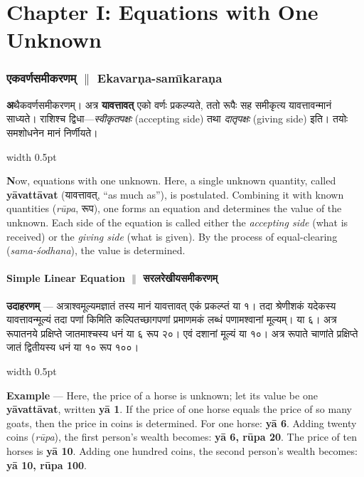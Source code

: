 \documentclass[11pt,a4paper]{article}
\newcommand{\dev}[1]{{\devanagarifont #1}}
\newcommand{\vs}{\vspace{0.5em}}
\newcommand{\bilingual}[2]{%
  \par\vspace{0.5em}%
  \noindent\begin{minipage}[t]{0.47\textwidth}%
  \setlength{\parindent}{0pt}%
  \small #1%
  \end{minipage}%
  \hfill\textcolor{columnrule}{\vrule width 0.5pt}\hfill%
  \begin{minipage}[t]{0.47\textwidth}%
  \setlength{\parindent}{0pt}%
  \small\raggedright #2%
  \end{minipage}%
  \par\vspace{0.5em}%
}
\begin{document}
\newpage

\part*{Chapter I: Equations with One Unknown}

\section*{\dev{एकवर्णसमीकरणम्} $\parallel$ Ekavar\d{n}a-sam\={\i}kara\d{n}a}

\bilingual{\textbf{\dev{अ}}थैकवर्णसमीकरणम्। अत्र \textbf{यावत्तावत्} एको वर्णः प्रकल्प्यते, ततो रूपैः सह समीकृत्य यावत्तावन्मानं साध्यते। राशिश्च द्विधा—\textit{स्वीकृतपक्षः} (accepting side) तथा \textit{दातृपक्षः} (giving side) इति। तयोः समशोधनेन मानं निर्णीयते।
}{%
\textbf{N}ow, equations with one unknown. Here, a single unknown quantity, called \textbf{y\={a}vatt\={a}vat} (\dev{यावत्तावत्}, ``as much as''), is postulated. Combining it with known quantities (\textit{r\={u}pa}, \dev{रूप}), one forms an equation and determines the value of the unknown. Each side of the equation is called either the \textit{accepting side} (what is received) or the \textit{giving side} (what is given). By the process of equal-clearing (\textit{sama-\'{s}odhana}), the value is determined.}

\vs

\subsection*{Simple Linear Equation $\parallel$ सरलरेखीयसमीकरणम्}

\bilingual{\textbf{उदाहरणम्} — अत्राश्वमूल्यमज्ञातं तस्य मानं \dev{यावत्तावत्} एकं प्रकल्प्तं \dev{या १}। तदा श्रेणीशकं यदेकस्य यावत्तावन्मूल्यं तदा पणां किमिति कल्पितच्छागपणां प्रमाणमकं लब्धं पणामश्वानां मूल्यम्। \dev{या ६}। अत्र रूपातनये प्रक्षिप्ते जातमाश्चस्य धनं \dev{या ६ रूप २०}। एवं दशानां मूल्यं \dev{या १०}। अत्र रूपाते चाणांते प्रक्षिप्ते जातं द्वितीयस्य धनं \dev{या १० रूप १००}।
}{%
\textbf{Example} --- Here, the price of a horse is unknown; let its value be one \textbf{y\={a}vatt\={a}vat}, written \textbf{y\={a} 1}. If the price of one horse equals the price of so many goats, then the price in coins is determined. For one horse: \textbf{y\={a} 6}. Adding twenty coins (\textit{r\={u}pa}), the first person's wealth becomes: \textbf{y\={a} 6, r\={u}pa 20}. The price of ten horses is \textbf{y\={a} 10}. Adding one hundred coins, the second person's wealth becomes: \textbf{y\={a} 10, r\={u}pa 100}.}
\end{document}
